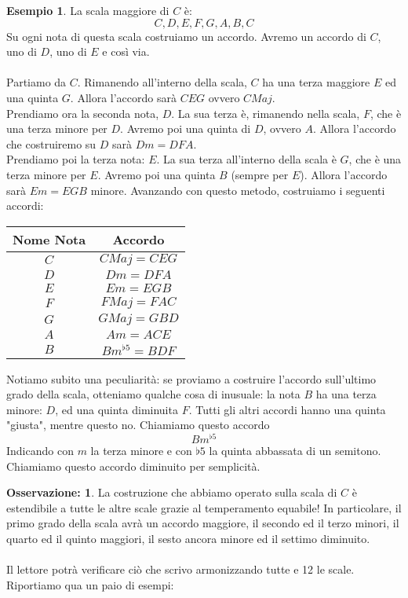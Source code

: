 \documentclass[12pt,a4paper]{book}
\theoremstyle{definition}
\theoremstyle{Theorem}
\theoremstyle{definition}
\newtheorem{Ex}[Def]{Esempio}
\theoremstyle{definition}
\theoremstyle{definition}
\newtheorem{Obs}[Def]{Osservazione:}
\begin{document}
	 		\begin{Ex}
	 			La scala maggiore di $C$ è:
	 			$$C,D,E,F,G,A,B,C$$
	 			Su ogni nota di questa scala costruiamo un accordo. Avremo un accordo di $C$, uno di $D$, uno di $E$ e così via.\\
	 			\\
	 			Partiamo da $C$. Rimanendo all'interno della scala, $C$ ha una terza maggiore $E$ ed una quinta $G$. Allora l'accordo sarà $CEG$ ovvero $CMaj$.\\
	 			Prendiamo ora la seconda nota, $D$. La sua terza è, rimanendo nella scala, $F$, che è una terza minore per $D$. Avremo poi una quinta di $D$, ovvero $A$. Allora l'accordo che costruiremo su $D$ sarà $Dm=DFA$.\\
	 			Prendiamo poi la terza nota: $E$. La sua terza all'interno della scala è $G$, che è una terza minore per $E$. Avremo poi una quinta $B$ (sempre per $E$). Allora l'accordo sarà $Em=EGB$ minore. Avanzando con questo metodo, costruiamo i seguenti accordi:
	 			\begin{center}
	 				\begin{tabular}{||c|c||}
	 					\hline
	 					Nome Nota & Accordo\\
	 					\hline
	 					$C$ & $CMaj=CEG$\\
	 					\hline
	 					$D$ & $Dm=DFA$\\
	 					\hline
	 					$E$ & $Em=EGB$\\
	 					\hline
	 					$F$ & $FMaj=FAC$\\
	 					\hline
	 					$G$ & $GMaj=GBD$\\
	 					\hline
	 					$A$ & $Am=ACE$\\
	 					\hline
	 					$B$ & $Bm^{\flat5}=BDF$\\
	 					\hline
	 				\end{tabular}
	 			\end{center}
	 			Notiamo subito una peculiarità: se proviamo a costruire l'accordo sull'ultimo grado della scala, otteniamo qualche cosa di inusuale: la nota $B$ ha una terza minore: $D$, ed una quinta diminuita $F$. Tutti gli altri accordi hanno una quinta "giusta", mentre questo no. Chiamiamo questo accordo $$Bm^{\flat5}$$
	 			Indicando con $m$ la terza minore e con $\flat5$ la quinta abbassata di un semitono. Chiamiamo questo accordo diminuito per semplicità.
	 		\end{Ex}
	 		\begin{Obs}
	 			La costruzione che abbiamo operato sulla scala di $C$ è estendibile a tutte le altre scale grazie al temperamento equabile! In particolare, il primo grado della scala avrà un accordo maggiore, il secondo ed il terzo minori, il quarto ed il quinto maggiori, il sesto ancora minore ed il settimo diminuito.\\
	 			\\
	 			Il lettore potrà verificare ciò che scrivo armonizzando tutte e 12 le scale. Riportiamo qua un paio di esempi:
	 		\end{Obs}
\end{document}
